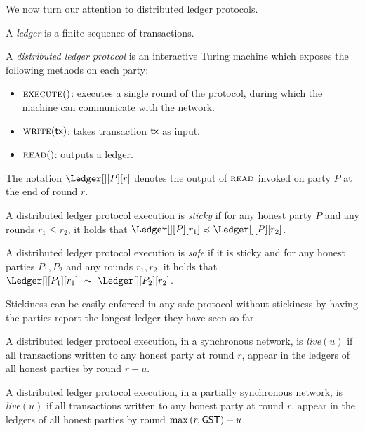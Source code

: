 We now turn our attention to distributed ledger protocols.

\begin{definition}[Ledger]
  A \emph{ledger} is a finite sequence of transactions.
\end{definition}

\begin{definition}
  A \emph{distributed ledger protocol} is an
  interactive Turing machine which exposes the following
  methods on each party:
  \begin{itemize}
    \item $\textsc{execute}()$: executes a single round of the protocol, during
      which the machine can communicate with the network.
    \item $\textsc{write}(\textsf{tx})$: takes transaction $\textsf{tx}$ as input.
    \item $\textsc{read}()$: outputs a ledger.
  \end{itemize}
\end{definition}

The notation
$\Ledger[][P][r]$ denotes the output of $\textsc{read}$
invoked on party $P$ at the end of round $r$.

\begin{definition}[Stickiness]
  A distributed ledger protocol execution is \emph{sticky} if
  for any honest party $P$ and any rounds $r_1 \leq r_2$,
  it holds that $\Ledger[][P][r_1] \preccurlyeq \Ledger[][P][r_2]$.
\end{definition}

\begin{definition}[Safety]
  A distributed ledger protocol execution is \emph{safe} if it is sticky and
  for any honest parties $P_1, P_2$ and any rounds $r_1, r_2$, it holds that
  $\Ledger[][P_1][r_1]~\sim~\Ledger[][P_2][r_2]$.
\end{definition}

Stickiness can be easily enforced in any safe protocol
without stickiness by having the parties report the longest
ledger they have seen so far~\cite{streamlet}.

\begin{definition}
  A distributed ledger protocol execution, in a synchronous network, is \emph{live}$(u)$ if
  all transactions written to any honest party
  at round $r$, appear in the ledgers of all honest parties by round
  $r + u$.
\end{definition}

\begin{definition}
  A distributed ledger protocol execution, in a partially synchronous network,
  is \emph{live}$(u)$ if all transactions written to any honest party
  at round $r$, appear in the ledgers of all honest parties by round
  $\max{(r,\textsf{GST})} + u$.
\end{definition}